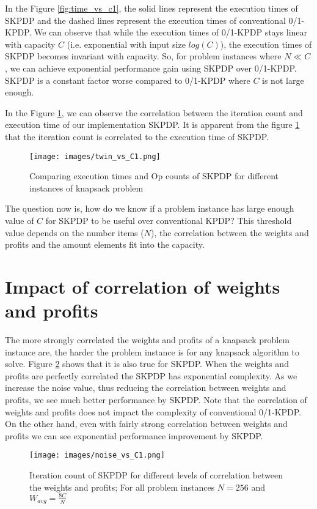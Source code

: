 In the Figure \ref{fig:time_vs_c1}, the solid lines represent the execution times of SKPDP and the dashed lines represent the execution times of conventional 0/1-KPDP. We can observe that while the execution times of 0/1-KPDP stays linear with capacity $C$ (i.e. exponential with input size $log(C)$), the execution times of SKPDP becomes invariant with capacity. So, for problem instances where $N \ll C$, we can achieve exponential performance gain using SKPDP over 0/1-KPDP. SKPDP is a constant factor worse compared to 0/1-KPDP where $C$ is not large enough.

In the Figure \ref{fig:twin_vs_c1}, we can observe the correlation between the iteration count and execution time of our implementation SKPDP. It is apparent from the figure \ref{fig:twin_vs_c1} that the iteration count is correlated to the execution time of SKPDP.

\begin{figure}[htbp]
\centerline{\texttt{[image: images/twin\_vs\_C1.png]}}
\caption{Comparing execution times and Op counts of SKPDP for different instances of knapsack problem}
\label{fig:twin_vs_c1}
\end{figure}

The question now is, how do we know if a problem instance has large enough value of $C$ for SKPDP to be useful over conventional KPDP? This threshold value depends on the number items ($N$), the correlation between the weights and profits and the amount elements fit into the capacity. 


\section{Impact of correlation of weights and profits}
The more strongly correlated the weights and profits of a knapsack problem instance are, the harder the problem instance is for any knapsack algorithm to solve. Figure \ref{fig:noise_vs_c1} shows that it is also true for SKPDP. When the weights and profits are perfectly correlated the SKPDP has exponential complexity. As we increase the noise value, thus reducing the correlation between weights and profits, we see much better performance by SKPDP. Note that the correlation of weights and profits does not impact the complexity of conventional 0/1-KPDP. On the other hand, even with fairly strong correlation between weights and profits we can see exponential performance improvement by SKPDP.

\begin{figure}[htbp]
\centerline{\texttt{[image: images/noise\_vs\_C1.png]}}
\caption{Iteration count of SKPDP for different levels of correlation between the weights and profits; For all problem instances $N = 256$ and $W_{avg} = \frac{8C}{N}$}
\label{fig:noise_vs_c1}
\end{figure}
\newpage



